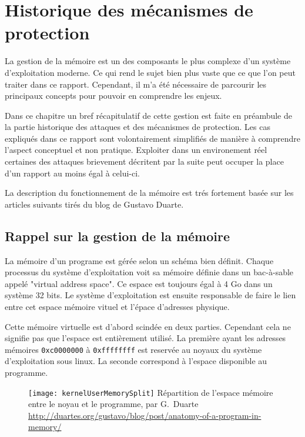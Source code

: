 \chapter{Historique des mécanismes de protection}
\label{chap:historique}

La gestion de la mémoire est un des composants le plus complexe d'un système d'exploitation moderne. Ce qui rend le sujet bien plus vaste que ce que l'on peut traiter dans ce rapport. Cependant, il m'a été nécessaire de parcourir les principaux concepts pour pouvoir en comprendre les enjeux.

Dans ce chapitre un bref récapitulatif de cette gestion est faite en préambule de la partie historique des attaques et des mécanismes de protection. Les cas expliqués dans ce rapport sont volontairement simplifiés de manière à comprendre l'aspect conceptuel et non pratique. Exploiter dans un environement réel certaines des attaques brievement décritent par la suite peut occuper la place d'un rapport au moins égal à celui-ci.

La description du fonctionnement de la mémoire est trés fortement basée sur les articles suivants \cite{AnatomyOfAProgramInMemory} \cite{HowTheKernelManagesYourMemory} \cite{JourneyToTheStackPartI} tirés du blog de Gustavo Duarte.

\minitoc

\newpage

\section{Rappel sur la gestion de la mémoire}

La mémoire d'un programe est gérée selon un schéma bien définit. Chaque processus du système d'exploitation voit sa mémoire définie dans un bac-à-sable appelé "virtual address space". Ce espace est toujours égal à 4 Go dans un système 32 bits. Le système d'exploitation est ensuite responsable de faire le lien entre cet espace mémoire vituel et l'épace d'adresses physique.

Cette mémoire virtuelle est d'abord scindée en deux parties. Cependant cela ne signifie pas que l'espace est entièrement utilisé. La première ayant les adresses mémoires \texttt{0xc0000000} à \texttt{0xffffffff} est reservée au noyaux du système d'exploitation sous linux. La seconde correspond à l'espace disponible au programme.

\begin{figure}[H]
	\texttt{[image: kernelUserMemorySplit]}
	{Répartition de l'espace mémoire entre le noyau et le programme, par G.~Duarte}
	{\url{http://duartes.org/gustavo/blog/post/anatomy-of-a-program-in-memory/}}
	\label{fig:kernelUserMemorySplit}
\end{figure}

